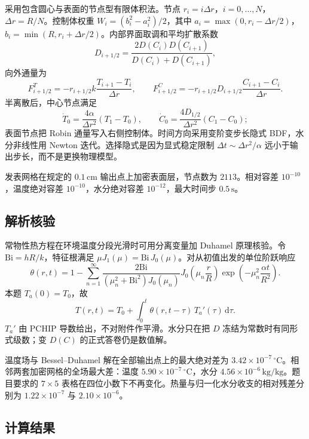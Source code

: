 采用包含圆心与表面的节点型有限体积法。节点 $r_i=i\Delta r$，$i=0,\ldots,N$，$\Delta r=R/N$。控制体权重 $W_i=(b_i^2-a_i^2)/2$，其中 $a_i=\max(0,r_i-\Delta r/2)$，$b_i=\min(R,r_i+\Delta r/2)$。内部界面取调和平均扩散系数
\[
D_{i+1/2}=\frac{2D(C_i)D(C_{i+1})}{D(C_i)+D(C_{i+1})},
\]
向外通量为
\[
F^T_{i+1/2}=-r_{i+1/2}k\frac{T_{i+1}-T_i}{\Delta r},\qquad
F^C_{i+1/2}=-r_{i+1/2}D_{i+1/2}\frac{C_{i+1}-C_i}{\Delta r}.
\]
半离散后，中心节点满足
\[
\dot T_0=\frac{4\alpha}{\Delta r^2}(T_1-T_0),\qquad
\dot C_0=\frac{4D_{1/2}}{\Delta r^2}(C_1-C_0);
\]
表面节点把 Robin 通量写入右侧控制体。时间方向采用变阶变步长隐式 BDF，水分非线性用 Newton 迭代。选择隐式是因为显式稳定限制 $\Delta t\sim\Delta r^2/\alpha$ 远小于输出步长，而不是更换物理模型。

发表网格在规定的 $0.1\,\mathrm{cm}$ 输出点上加密表面层，节点数为 $2113$。相对容差 $10^{-10}$，温度绝对容差 $10^{-10}$，水分绝对容差 $10^{-12}$，最大时间步 $0.5\,\mathrm{s}$。

\subsection{解析核验}

常物性热方程在环境温度分段光滑时可用分离变量加 Duhamel 原理核验。令 $\mathrm{Bi}=hR/k$，特征根满足 $\mu J_1(\mu)=\mathrm{Bi}\,J_0(\mu)$。对从初值出发的单位阶跃响应
\begin{equation}
\theta(r,t)=1-\sum_{n=1}^{\infty}
\frac{2\mathrm{Bi}}{(\mu_n^2+\mathrm{Bi}^2)J_0(\mu_n)}
J_0\!\left(\mu_n\frac{r}{R}\right)
\exp\!\left(-\mu_n^2\frac{\alpha t}{R^2}\right).
\label{eq:bessel}
\end{equation}
本题 $T_a(0)=T_0$，故
\begin{equation}
T(r,t)=T_0+\int_0^t \theta(r,t-\tau)\,T_a'(\tau)\,\mathrm{d}\tau.
\label{eq:duhamel}
\end{equation}
$T_a'$ 由 PCHIP 导数给出，不对附件作平滑。水分只在把 $D$ 冻结为常数时有同形式级数；变 $D(C)$ 的正式答卷仍是数值解。

温度场与 Bessel--Duhamel 解在全部输出点上的最大绝对差为 $3.42\times10^{-7}\,{}^\circ\mathrm{C}$。相邻两套加密网格的全场最大差：温度 $5.90\times10^{-7}\,{}^\circ\mathrm{C}$，水分 $4.56\times10^{-6}\,\mathrm{kg/kg}$。题目要求的 $7\times5$ 表格在四位小数下不再变化。热量与归一化水分收支的相对残差分别为 $1.22\times10^{-7}$ 与 $2.10\times10^{-6}$。

\subsection{计算结果}

